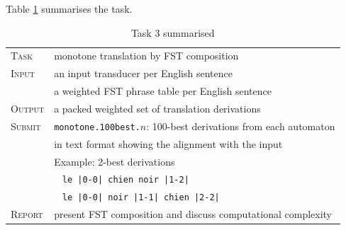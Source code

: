 Table \ref{tab:task3} summarises the task. 

\begin{table}[h]\centering
\begin{tabular}{l p{12cm}}
\textsc{Task}   &  monotone translation by FST composition \\
\textsc{Input}  &  an input transducer per English sentence \\
                &  a weighted FST phrase table per English sentence\\
\textsc{Output} &  a packed weighted set of translation derivations \\
\textsc{Submit} &  \texttt{monotone.100best.}$n$: 100-best derivations from each automaton \\
                &  in text format showing the alignment with the input\\
                &  Example: 2-best derivations \\
                & ~ \texttt{le |0-0| chien noir |1-2|} \\
                & ~ \texttt{le |0-0| noir |1-1| chien |2-2|} \\
\textsc{Report} & present FST composition and discuss computational complexity \\                
\end{tabular}
\caption{\label{tab:task3}Task 3 summarised}
\end{table}

